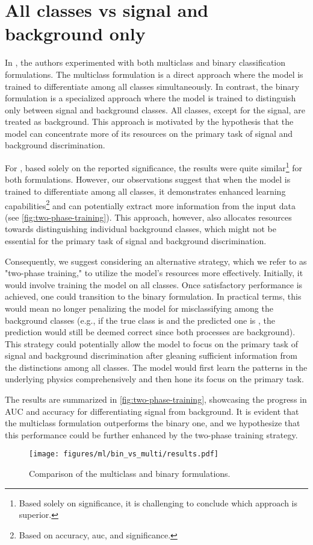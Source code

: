 \section{All classes vs signal and background only}
\label{sec:binary}

In \cite{severin}, the authors experimented with both multiclass and binary classification formulations. The multiclass
formulation is a direct approach where the model is trained to differentiate among all classes simultaneously. In
contrast, the binary formulation is a specialized approach where the model is trained to distinguish only between signal
and background classes. All classes, except for the signal, are treated as background. This approach is motivated by the
hypothesis that the model can concentrate more of its resources on the primary task of signal and background
discrimination.

For \cite{severin}, based solely on the reported significance, the results were quite similar\footnote{Based solely on
    significance, it is challenging to conclude which approach is superior.} for both formulations. However, our
observations suggest that when the model is trained to differentiate among all classes, it demonstrates enhanced
learning capabilities\footnote{Based on accuracy, \gls{auc}, and significance.} and can potentially extract more
information from the input data (see \autoref{fig:two-phase-training}). This approach, however, also allocates resources
towards distinguishing individual background classes, which might not be essential for the primary task of signal and
background discrimination.

Consequently, we suggest considering an alternative strategy, which we refer to as "two-phase training," to utilize the
model's resources more effectively. Initially, it would involve training the model on all classes. Once satisfactory
performance is achieved, one could transition to the binary formulation. In practical terms, this would mean no longer
penalizing the model for misclassifying among the background classes (e.g., if the true class is \ttw and the predicted
one is \ttz, the prediction would still be deemed correct since both processes are background). This strategy could
potentially allow the model to focus on the primary task of signal and background discrimination after gleaning
sufficient information from the distinctions among all classes. The model would first learn the patterns in the
underlying physics comprehensively and then hone its focus on the primary task.

The results are summarized in \autoref{fig:two-phase-training}, showcasing the progress in AUC and accuracy for
differentiating signal from background. It is evident that the multiclass formulation outperforms the binary one, and
we hypothesize that this performance could be further enhanced by the two-phase training strategy.


\begin{figure}[htb]
    \centering
    \texttt{[image: figures/ml/bin\_vs\_multi/results.pdf]}
    \caption{Comparison of the multiclass and binary formulations.}
    \label{fig:two-phase-training}
\end{figure}
